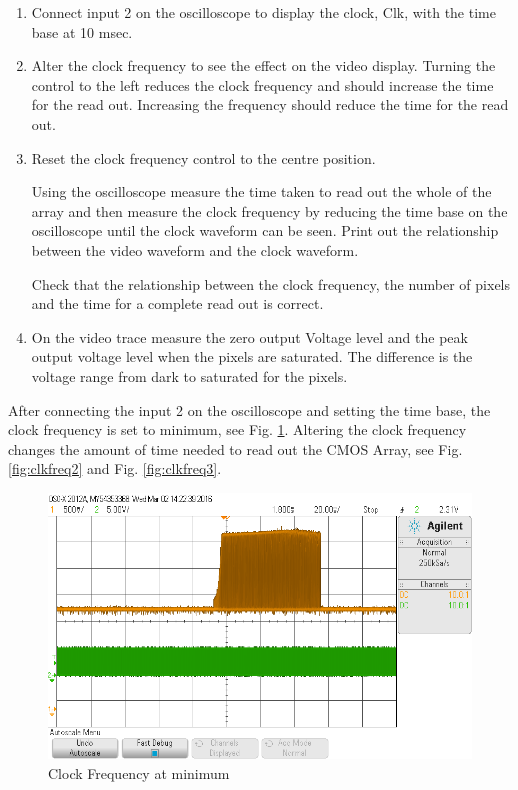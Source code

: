 \begin{enumerate}
	\item Connect input 2 on the oscilloscope to display the clock, Clk, with the time base at 10 msec.
	\item Alter the clock frequency to see the effect on the video display. Turning the control to the
left reduces the clock frequency and should increase the time for the read out. Increasing
the frequency should reduce the time for the read out.
	\item Reset the clock frequency control to the centre position.

Using the oscilloscope measure the time taken to read out the whole of the array and then
measure the clock frequency by reducing the time base on the oscilloscope until the clock
waveform can be seen. Print out the relationship between the video waveform and the clock
waveform.

Check that the relationship between the clock frequency, the number of pixels and the time
for a complete read out is correct.
	\item On the video trace measure the zero output Voltage level and the peak output voltage level
when the pixels are saturated. The difference is the voltage range from dark to saturated for
the pixels.
\end{enumerate}


After connecting the input 2 on the oscilloscope and setting the time base, the clock frequency is set to minimum, see Fig. \ref{fig:clkfreq1}. Altering the clock frequency changes the amount of time needed to read out the CMOS Array, see Fig. \ref{fig:clkfreq2} and Fig. \ref{fig:clkfreq3}.


\begin{figure}[H]
\begin{center}
\includegraphics[scale=0.4]{LabFour/scope_53}
\end{center}
\caption{Clock Frequency at minimum}
\label{fig:clkfreq1}
\end{figure}

